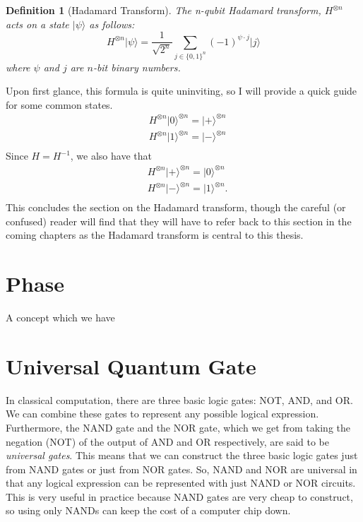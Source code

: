 \documentclass[12pt,twoside]{reedthesis}
\newtheorem{definition}{Definition}
\newcommand{\ketz}{\ensuremath{\lvert 0\rangle}\xspace}
\newcommand{\keto}{\ensuremath{\lvert 1\rangle}\xspace}
\newcommand{\ket}[1]{\ensuremath{\lvert #1\rangle}\xspace}
\newcommand{\Hplus}{\ensuremath{\lvert + \rangle}\xspace}
\newcommand{\Hminus}{\ensuremath{\lvert- \rangle}\xspace}
\begin{document}
\begin{definition}[Hadamard Transform] The n-qubit Hadamard transform, $H^{\otimes n}$ acts on a state $\ket{\psi}$ as follows:
\begin{equation*}
H^{\otimes n} \ket{\psi} = \frac{1}{\sqrt{2^n}} \sum_{j \in \{0,1\}^n} (-1)^{\psi \cdot j} \ket{j}
\end{equation*}
where $\psi$ and $j$ are $n$-bit binary numbers.
\end{definition}
Upon first glance, this formula is quite uninviting, so I will provide a quick guide for some common states. 
\begin{align*}
& H^{\otimes n} \ketz^{\otimes n} = \Hplus^{\otimes n} \\
& H^{\otimes n} \keto^{\otimes n} = \Hminus^{\otimes n} \\
\end{align*}
Since $H = H^{-1}$, we also have that
\begin{align*}
& H^{\otimes n} \Hplus^{\otimes n} =  \ketz^{\otimes n} \\
& H^{\otimes n} \Hminus^{\otimes n} = \keto^{\otimes n}. \\
\end{align*}
This concludes the section on the Hadamard transform, though the careful (or confused) reader will find that they will have to refer back to this section in the coming chapters as the Hadamard transform is central to this thesis. 

\section{Phase}
A concept which we have 

\section{Universal Quantum Gate}
In classical computation, there are three basic logic gates: NOT, AND, and OR. We can combine these gates to represent any possible logical expression. Furthermore, the NAND gate and the NOR gate, which we get from taking the negation (NOT) of the output of AND and OR respectively, are said to be \textit{universal gates}. This means that we can construct the three basic logic gates just from NAND gates or just from NOR gates. So, NAND and NOR are universal in that any logical expression can be represented with just NAND or NOR circuits. This is very useful in practice because NAND gates are very cheap to construct, so using only NANDs can keep the cost of a computer chip down.
\end{document}
